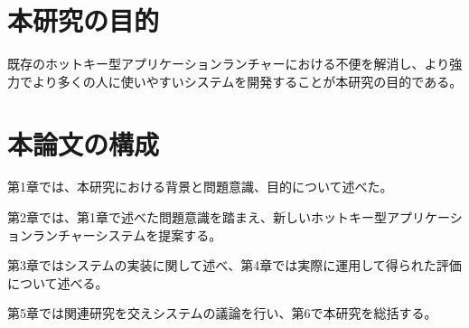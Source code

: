 \section{本研究の目的}
既存のホットキー型アプリケーションランチャーにおける不便を解消し、より強力でより多くの人に使いやすいシステムを開発することが本研究の目的である。

\section{本論文の構成}

第1章では、本研究における背景と問題意識、目的について述べた。

第2章では、第1章で述べた問題意識を踏まえ、新しいホットキー型アプリケーションランチャーシステムを提案する。

第3章ではシステムの実装に関して述べ、第4章では実際に運用して得られた評価について述べる。

第5章では関連研究を交えシステムの議論を行い、第6で本研究を総括する。
